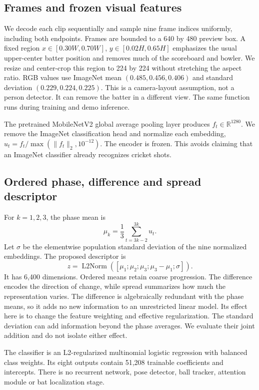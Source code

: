 \subsection{Frames and frozen visual features}
We decode each clip sequentially and sample nine frame indices uniformly, including both endpoints. Frames are bounded to a 640 by 480 preview box. A fixed region $x\in[0.30W,0.70W]$, $y\in[0.02H,0.65H]$ emphasizes the usual upper-center batter position and removes much of the scoreboard and bowler. We resize and center-crop this region to 224 by 224 without stretching the aspect ratio. RGB values use ImageNet mean $(0.485,0.456,0.406)$ and standard deviation $(0.229,0.224,0.225)$. This is a camera-layout assumption, not a person detector. It can remove the batter in a different view. The same function runs during training and demo inference.

The pretrained MobileNetV2 global average pooling layer produces $f_t\in\mathbb{R}^{1280}$. We remove the ImageNet classification head and normalize each embedding, $u_t=f_t/\max(\|f_t\|_2,10^{-12})$. The encoder is frozen. This avoids claiming that an ImageNet classifier already recognizes cricket shots.

\subsection{Ordered phase, difference and spread descriptor}
For $k=1,2,3$, the phase mean is
\begin{equation}
\mu_k=\frac{1}{3}\sum_{t=3k-2}^{3k}u_t.
\end{equation}
Let $\sigma$ be the elementwise population standard deviation of the nine normalized embeddings. The proposed descriptor is
\begin{equation}
z=\operatorname{L2Norm}([\mu_1;\mu_2;\mu_3;\mu_3-\mu_1;\sigma]).
\end{equation}
It has 6,400 dimensions. Ordered means retain coarse progression. The difference encodes the direction of change, while spread summarizes how much the representation varies. The difference is algebraically redundant with the phase means, so it adds no new information to an unrestricted linear model. Its effect here is to change the feature weighting and effective regularization. The standard deviation can add information beyond the phase averages. We evaluate their joint addition and do not isolate either effect.

The classifier is an L2-regularized multinomial logistic regression with balanced class weights. Its eight outputs contain 51,208 trainable coefficients and intercepts. There is no recurrent network, pose detector, ball tracker, attention module or bat localization stage.

